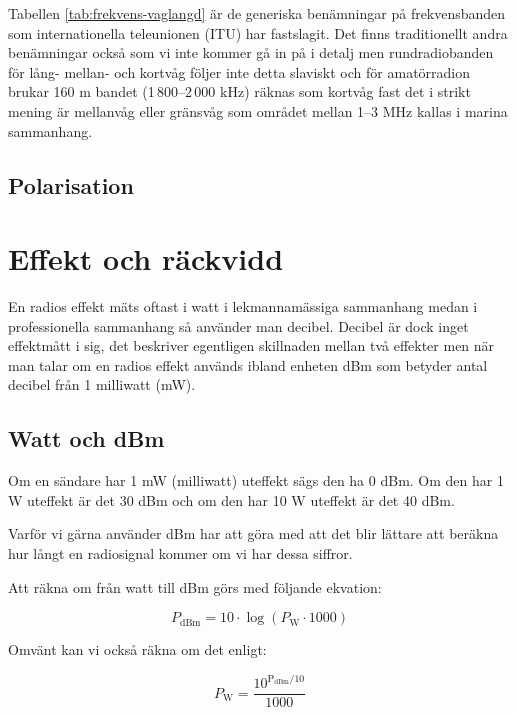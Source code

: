Tabellen \ref{tab:frekvens-vaglangd} är de generiska benämningar på frekvensbanden som internationella teleunionen (ITU) har fastslagit. Det finns traditionellt andra benämningar också som vi inte kommer gå in på i detalj men rundradiobanden för lång- mellan- och kortvåg följer inte detta slaviskt och för amatörradion brukar 160 m bandet (1\,800--2\,000 kHz) räknas som kortvåg fast det i strikt mening är mellanvåg eller gränsvåg som området mellan 1--3 MHz kallas i marina sammanhang.

\subsection{Polarisation}


\section{Effekt och räckvidd}

En radios effekt mäts oftast i watt i lekmannamässiga sammanhang medan i professionella sammanhang så använder man decibel. Decibel är dock inget effektmått i sig, det beskriver egentligen skillnaden mellan två effekter men när man talar om en radios effekt används ibland enheten dBm som betyder antal decibel från 1 milliwatt (mW).

\subsection{Watt och dBm}

Om en sändare har 1 mW (milliwatt) uteffekt sägs den ha 0 dBm. Om den har 1 W uteffekt är det 30 dBm och om den har 10 W uteffekt är det 40 dBm.

Varför vi gärna använder dBm har att göra med att det blir lättare att beräkna hur långt en radiosignal kommer om vi har dessa siffror. 

Att räkna om från watt till dBm görs med följande ekvation:

\begin{equation}
P_{\mathrm{dBm}}=10\cdot\log(P_{\mathrm{W}}\cdot 1000)
\end{equation}

Omvänt kan vi också räkna om det enligt:

\begin{equation}
P_{\mathrm{W}}=\frac{10^{\mathrm{P_{dBm}}/10}}{1000}
\end{equation}

